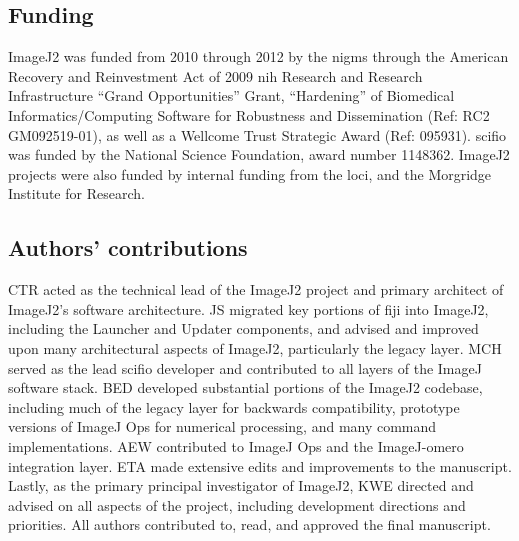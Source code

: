 \documentclass{bmcart}
\begin{document}
\begin{backmatter}
\subsection*{Funding}
  ImageJ2 was funded from 2010 through 2012 by the \acrfull{nigms} through the
  American Recovery and Reinvestment Act of 2009 \acrshort{nih} Research and
  Research Infrastructure ``Grand Opportunities'' Grant, ``Hardening'' of
  Biomedical Informatics/Computing Software for Robustness and Dissemination
  (Ref: RC2 GM092519-01), as well as a Wellcome Trust Strategic Award (Ref:
  095931). \acrshort{scifio} was funded by the National Science Foundation,
  award number 1148362. ImageJ2 projects were also funded by internal funding
  from the \acrlong{loci}, and the Morgridge Institute for Research.

\subsection*{Authors' contributions}
  CTR acted as the technical lead of the ImageJ2 project and primary architect
  of ImageJ2's software architecture. JS migrated key portions of
  \acrshort{fiji} into ImageJ2, including the Launcher and Updater components,
  and advised and improved upon many architectural aspects of ImageJ2,
  particularly the legacy layer. MCH served as the lead \acrshort{scifio}
  developer and contributed to all layers of the ImageJ software stack. BED
  developed substantial portions of the ImageJ2 codebase, including much of the
  legacy layer for backwards compatibility, prototype versions of ImageJ Ops
  for numerical processing, and many command implementations. AEW contributed
  to ImageJ Ops and the ImageJ-\acrshort{omero} integration layer. ETA made
  extensive edits and improvements to the manuscript. Lastly, as the primary
  principal investigator of ImageJ2, KWE directed and advised on all aspects of
  the project, including development directions and priorities. All authors
  contributed to, read, and approved the final manuscript.


\end{backmatter}
\end{document}
